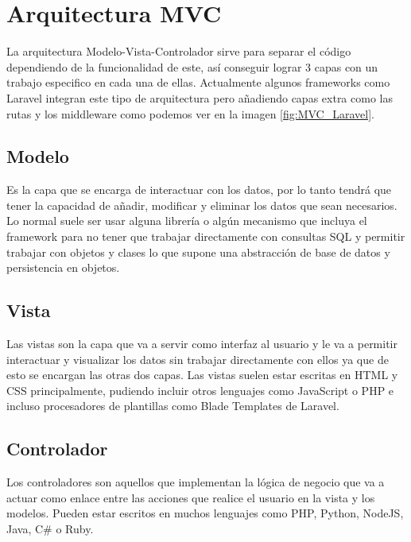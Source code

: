 \section{Arquitectura MVC}\label{MVC}

La arquitectura Modelo-Vista-Controlador sirve para separar el código dependiendo de la funcionalidad de este, así conseguir lograr 3 capas con un trabajo especifico en cada una de ellas\cite{MVC}. Actualmente algunos frameworks como Laravel integran este tipo de arquitectura pero añadiendo capas extra como las rutas y los middleware como podemos ver en la imagen \ref{fig:MVC_Laravel}.


\subsection{Modelo}

Es la capa que se encarga de interactuar con los datos, por lo tanto tendrá que tener la capacidad de añadir, modificar y eliminar los datos que sean necesarios. Lo normal suele ser usar alguna librería o algún mecanismo que incluya el framework para no tener que trabajar directamente con consultas SQL y permitir trabajar con objetos y clases lo que supone una abstracción de base de datos y persistencia en objetos\cite{MVC}.

\subsection{Vista}

Las vistas son la capa que va a servir como interfaz al usuario y le va a permitir interactuar y visualizar los datos sin trabajar directamente con ellos ya que de esto se encargan las otras dos capas. Las vistas suelen estar escritas en HTML y CSS principalmente, pudiendo incluir otros lenguajes como JavaScript o PHP e incluso procesadores de plantillas como Blade Templates de Laravel\cite{MVC}.

\subsection{Controlador}

Los controladores son aquellos que implementan la lógica de negocio que va a actuar como enlace entre las acciones que realice el usuario en la vista y los modelos. Pueden estar escritos en muchos lenguajes como PHP, Python, NodeJS, Java, C\# o Ruby\cite{MVC}.

